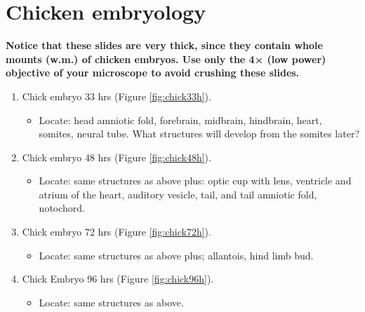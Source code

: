 \documentclass[]{book}
\providecommand{\tightlist}{%
  \setlength{\itemsep}{0pt}\setlength{\parskip}{0pt}}
\theoremstyle{definition}
\theoremstyle{definition}
\theoremstyle{definition}
\theoremstyle{remark}
\let\BeginKnitrBlock\begin \let\EndKnitrBlock\end
\begin{document}
\section{Chicken embryology}\label{chicken-embryology}

\BeginKnitrBlock{rmdcaution}
\textbf{Notice that these slides are very thick, since they contain
whole mounts (w.m.) of chicken embryos. Use only the 4× (low power)
objective of your microscope to avoid crushing these slides.}
\EndKnitrBlock{rmdcaution}

\begin{enumerate}
\def\labelenumi{\arabic{enumi}.}
\tightlist
\item
  Chick embryo 33 hrs (Figure \ref{fig:chick33h}).

\begin{itemize}
\tightlist
  \item
  Locate: head
  amniotic fold, forebrain, midbrain, hindbrain, heart, somites, neural
  tube. What structures will develop from the somites later?
\end{itemize}
\item
  Chick embryo 48 hrs (Figure \ref{fig:chick48h}).
  \begin{itemize}
  \tightlist
    \item
  Locate: same
  structures as above plus: optic cup with lens, ventricle and atrium of
  the heart, auditory vesicle, tail, and tail amniotic fold, notochord.
\end{itemize}
\item
  Chick embryo 72 hrs (Figure \ref{fig:chick72h}).
  \begin{itemize}
  \tightlist
    \item
  Locate: same
  structures as above plus; allantois, hind limb bud.
  \end{itemize}
\item
  Chick Embryo 96 hrs (Figure \ref{fig:chick96h}).
  \begin{itemize}
  \tightlist
    \item
  Locate: same
  structures as above.
  \end{itemize}
\end{enumerate}
\end{document}
